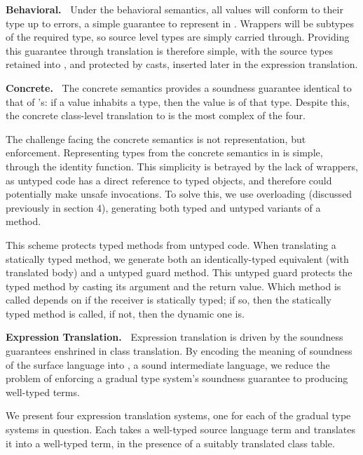 \documentclass[a4paper,USenglish]{tex/lipics-v2016}
\begin{document}
{\bf Behavioral.~} Under the behavioral semantics, all values will conform to
their type up to errors, a simple guarantee to represent in \kafka.  Wrappers
will be subtypes of the required \kafka type, so source level types are simply
carried through. Providing this guarantee through translation is therefore
simple, with the source types retained into \kafka, and protected by casts,
inserted later in the expression translation.

{\bf Concrete.~} The concrete semantics provides a soundness guarantee
identical to that of \kafka's: if a value inhabits a type, then the value is
of that type. Despite this, the concrete class-level translation to \kafka is
the most complex of the four.

The challenge facing the concrete semantics is not representation, but
enforcement. Representing types from the concrete semantics in \kafka is
simple, through the identity function. This simplicity is betrayed by the lack
of wrappers, as untyped code has a direct reference to typed objects, and
therefore could potentially make unsafe invocations. To solve this, we use
overloading (discussed previously in section 4), generating both typed and
untyped variants of a method.

This scheme protects typed methods from untyped code. When translating  a
statically typed method, we generate both an identically-typed equivalent
(with translated body) and a untyped guard method. This untyped guard protects
the typed method by casting its argument and the return value. Which method is
called depends on if the receiver is statically typed; if so, then the
statically typed method is called, if not, then the dynamic one is.

{\bf Expression Translation.~} Expression translation is driven by the
soundness guarantees enshrined in class translation. By encoding the  meaning
of soundness of the surface language into \kafka, a sound intermediate
language, we reduce the problem of enforcing a gradual type system's soundness
guarantee to producing well-typed \kafka terms. 

We present four expression translation systems, one for each of the
gradual type systems in question. Each takes a well-typed source language term
and translates it into a well-typed \kafka term, in the presence of a suitably
translated class table. 
\end{document}
